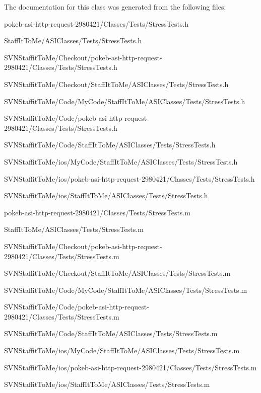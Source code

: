 \-The documentation for this class was generated from the following files\-:\begin{DoxyCompactItemize}
\item 
pokeb-\/asi-\/http-\/request-\/2980421/\-Classes/\-Tests/\-Stress\-Tests.\-h\item 
\-Staff\-It\-To\-Me/\-A\-S\-I\-Classes/\-Tests/\-Stress\-Tests.\-h\item 
\-S\-V\-N\-Staffit\-To\-Me/\-Checkout/pokeb-\/asi-\/http-\/request-\/2980421/\-Classes/\-Tests/\-Stress\-Tests.\-h\item 
\-S\-V\-N\-Staffit\-To\-Me/\-Checkout/\-Staff\-It\-To\-Me/\-A\-S\-I\-Classes/\-Tests/\-Stress\-Tests.\-h\item 
\-S\-V\-N\-Staffit\-To\-Me/\-Code/\-My\-Code/\-Staff\-It\-To\-Me/\-A\-S\-I\-Classes/\-Tests/\-Stress\-Tests.\-h\item 
\-S\-V\-N\-Staffit\-To\-Me/\-Code/pokeb-\/asi-\/http-\/request-\/2980421/\-Classes/\-Tests/\-Stress\-Tests.\-h\item 
\-S\-V\-N\-Staffit\-To\-Me/\-Code/\-Staff\-It\-To\-Me/\-A\-S\-I\-Classes/\-Tests/\-Stress\-Tests.\-h\item 
\-S\-V\-N\-Staffit\-To\-Me/ios/\-My\-Code/\-Staff\-It\-To\-Me/\-A\-S\-I\-Classes/\-Tests/\-Stress\-Tests.\-h\item 
\-S\-V\-N\-Staffit\-To\-Me/ios/pokeb-\/asi-\/http-\/request-\/2980421/\-Classes/\-Tests/\-Stress\-Tests.\-h\item 
\-S\-V\-N\-Staffit\-To\-Me/ios/\-Staff\-It\-To\-Me/\-A\-S\-I\-Classes/\-Tests/\-Stress\-Tests.\-h\item 
pokeb-\/asi-\/http-\/request-\/2980421/\-Classes/\-Tests/\-Stress\-Tests.\-m\item 
\-Staff\-It\-To\-Me/\-A\-S\-I\-Classes/\-Tests/\-Stress\-Tests.\-m\item 
\-S\-V\-N\-Staffit\-To\-Me/\-Checkout/pokeb-\/asi-\/http-\/request-\/2980421/\-Classes/\-Tests/\-Stress\-Tests.\-m\item 
\-S\-V\-N\-Staffit\-To\-Me/\-Checkout/\-Staff\-It\-To\-Me/\-A\-S\-I\-Classes/\-Tests/\-Stress\-Tests.\-m\item 
\-S\-V\-N\-Staffit\-To\-Me/\-Code/\-My\-Code/\-Staff\-It\-To\-Me/\-A\-S\-I\-Classes/\-Tests/\-Stress\-Tests.\-m\item 
\-S\-V\-N\-Staffit\-To\-Me/\-Code/pokeb-\/asi-\/http-\/request-\/2980421/\-Classes/\-Tests/\-Stress\-Tests.\-m\item 
\-S\-V\-N\-Staffit\-To\-Me/\-Code/\-Staff\-It\-To\-Me/\-A\-S\-I\-Classes/\-Tests/\-Stress\-Tests.\-m\item 
\-S\-V\-N\-Staffit\-To\-Me/ios/\-My\-Code/\-Staff\-It\-To\-Me/\-A\-S\-I\-Classes/\-Tests/\-Stress\-Tests.\-m\item 
\-S\-V\-N\-Staffit\-To\-Me/ios/pokeb-\/asi-\/http-\/request-\/2980421/\-Classes/\-Tests/\-Stress\-Tests.\-m\item 
\-S\-V\-N\-Staffit\-To\-Me/ios/\-Staff\-It\-To\-Me/\-A\-S\-I\-Classes/\-Tests/\-Stress\-Tests.\-m\end{DoxyCompactItemize}

